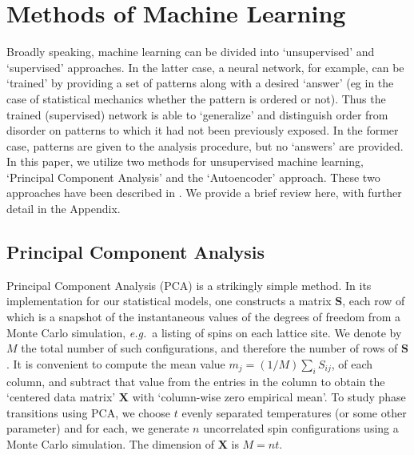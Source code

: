 \documentclass[pra,letterpaper,10pt,twocolumn]{revtex4}
\begin{document}
\section{Methods of Machine Learning}


Broadly speaking, machine learning can be divided into `unsupervised'
and `supervised' approaches.  In the latter case, a neural network, for
example, can be `trained' by providing a set of patterns along with a
desired `answer' (eg in the case of statistical mechanics whether the
pattern is ordered or not).  Thus the trained (supervised) network is
able to `generalize' and distinguish order from disorder on patterns to
which it had not been previously exposed.  In the former case, patterns
are given to the analysis procedure, but no `answers' are provided.  In
this paper, we utilize two methods for unsupervised machine learning,
`Principal Component Analysis' and the `Autoencoder' approach. These two
approaches have been described in \cite{Pearson, Wikipedia, Jolliffe,
Bourlard, Hinton, Ruslan}.  We provide a brief review here, with further
detail in the Appendix.


\subsection{Principal Component Analysis} 


Principal Component Analysis (PCA) \cite{Pearson, Wikipedia, Jolliffe} is a
strikingly simple method. In its implementation for our statistical
models, one constructs a matrix $\mathbf{S}$,
each row of which is 
a snapshot of the instantaneous values of the degrees of freedom from
a Monte Carlo simulation, {\it e.g.}~a listing of spins on each lattice site.
We denote by $M$ the total number of such configurations, and
therefore the number of rows of $\mathbf{S}$. It is convenient to compute the mean value 
$m_j=(1/M)\sum_{i}S_{ij}$, 
of each column, and
subtract that value from the entries in the column to
obtain the `centered data matrix' 
$\mathbf{X}$ with `column-wise zero empirical mean'. 
To study phase transitions using
PCA, we choose $t$ evenly separated temperatures (or some other parameter) 
and for each, we generate $n$ uncorrelated spin configurations
using a Monte Carlo simulation. 
The dimension of $\mathbf{X}$ is $M=nt$.
\end{document}
